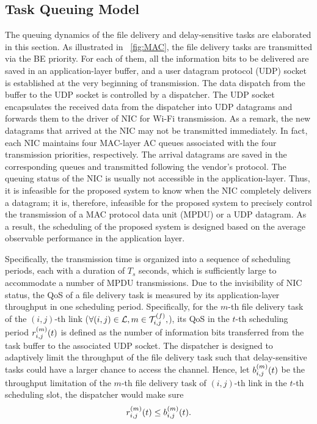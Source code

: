 \subsection{Task Queuing Model}

The queuing dynamics of the file delivery and delay-sensitive tasks are elaborated in this section.
As illustrated in \figurename~\ref{fig:MAC}, the file delivery tasks are transmitted via the BE priority.
For each of them, all the information bits to be delivered are saved in an application-layer buffer, and a user datagram protocol (UDP) socket is established at the very beginning of transmission.
The data dispatch from the buffer to the UDP socket is controlled by a dispatcher.
The UDP socket encapsulates the received data from the dispatcher into UDP datagrams and forwards them to the driver of NIC for Wi-Fi transmission.
As a remark, the new datagrams that arrived at the NIC may not be transmitted immediately.
In fact, each NIC maintains four MAC-layer AC queues associated with the four transmission priorities, respectively.
The arrival datagrams are saved in the corresponding queues and transmitted following the vendor's protocol.
The queuing status of the NIC is usually not accessible in the application-layer.
Thus, it is infeasible for the proposed system to know when the NIC completely delivers a datagram; it is, therefore, infeasible for the proposed system to precisely control the transmission of a MAC protocol data unit (MPDU) or a UDP datagram. As a result, the scheduling of the proposed system is designed based on the average observable performance in the application layer.

Specifically, the transmission time is organized into a sequence of scheduling periods, each with a duration of $T_s$ seconds, which is sufficiently large to accommodate a number of MPDU transmissions. Due to the invisibility of NIC status, the QoS of a file delivery task is measured by its application-layer throughput in one scheduling period. Specifically, for the $m$-th file delivery task of the $(i,j)$-th link ($\forall (i,j) \in{\mathcal{L}}, {m} \in{\mathcal{T}_{i,j}^{(f)}}, $), its QoS in the $t$-th scheduling period {$r_{i,j}^{(m)}(t)$} is defined as the number of information bits transferred from the task buffer to the associated UDP socket.
The dispatcher is designed to adaptively limit the throughput of the file delivery task such that delay-sensitive tasks could have a larger chance to access the channel. 
Hence, let ${b}_{i,j}^{(m)}(t)$ be the throughput limitation of the $m$-th file delivery task of {$(i,j)$}-th link in the {$t$}-th scheduling slot, the dispatcher would make sure
\begin{align}
    \label{eq:throughput_limitation}
    r_{i,j}^{(m)}(t) \leq {b}_{i,j}^{(m)}(t).
\end{align}

